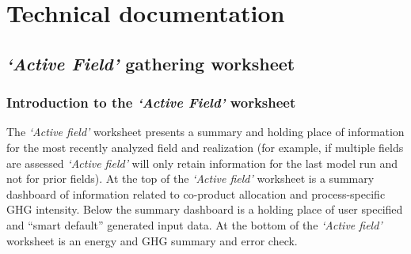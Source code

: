\documentclass[11pt]{report}
\newcommand{\sheet}[1]{\textit{`{#1}'}}
\begin{document}
\part{Technical documentation}







\chapter{\sheet{Active Field} gathering worksheet}
\label{sec:active_field}


\clearpage

\section{Introduction to the \sheet{Active Field} worksheet}

The \sheet{Active field} worksheet presents a summary and holding place of information for the most recently analyzed field and realization (for example, if multiple fields are assessed \sheet{Active field} will only retain information for the last model run and not for prior fields). At the top of the \sheet{Active field} worksheet is a summary dashboard of information related to co-product allocation and process-specific GHG intensity. Below the summary dashboard is a holding place of user specified and ``smart default'' generated input data. At the bottom of the \sheet{Active field} worksheet is an energy and GHG summary and error check.

\clearpage

\end{document}

